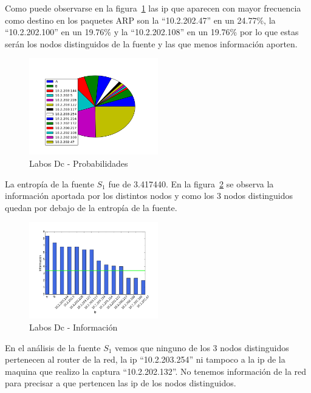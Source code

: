 \documentclass[final,inline,narroweqnarray,a4paper]{ieee}
\begin{document}
Como puede observarse en la figura~\ref{torta:laboDcS1} las ip que aparecen con mayor frecuencia como destino en los paquetes ARP son la ``10.2.202.47'' en un 24.77\%, la ``10.2.202.100'' en un 19.76\% y la ``10.2.202.108'' en un 19.76\% por lo que estas serán los nodos distinguidos de la fuente y las que menos información aporten.

\begin{figure}[H]
    \begin{center}
        \includegraphics[width=0.5\textwidth]{plot/laboDcS1-pie.png}
        \caption{Labos Dc - Probabilidades}
        \label{torta:laboDcS1}
    \end{center}
\end{figure} 

La entropía de la fuente $S_1$ fue de 3.417440. En la figura~\ref{histo:laboDcS1} se observa la información aportada por los distintos nodos y como los 3 nodos distinguidos quedan por debajo de la entropía de la fuente. 

\begin{figure}[H]
    \begin{center}
        \includegraphics[width=0.5\textwidth]{plot/laboDcS1-bar.png}
        \caption{Labos Dc - Información}
        \label{histo:laboDcS1}
    \end{center}
\end{figure}

En el análisis de la fuente $S_1$ vemos que ninguno de los 3 nodos distinguidos pertenecen al router de la red, la ip ``10.2.203.254'' ni tampoco a la ip de la maquina que realizo la captura ``10.2.202.132''. No tenemos información de la red para precisar a que pertencen las ip de los nodos distinguidos.
\end{document}
